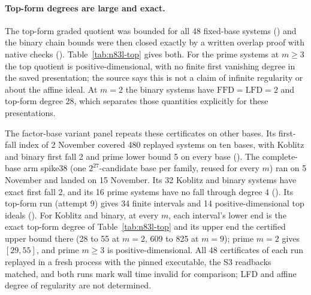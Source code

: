 \paragraph{Top-form degrees are large and exact.} The top-form graded
quotient was bounded for all 48 fixed-base systems
() and the binary chain
bounds were then closed exactly by a written overlap proof with native
checks ().
Table~\ref{tab:n83l-top} gives both. For the prime systems at $m\ge3$ the
top quotient is positive-dimensional, with no finite first vanishing degree
in the saved presentation; the source says this is not a claim of infinite
regularity or about the affine ideal. At $m=2$ the binary systems have
$\text{FFD}=\text{LFD}=2$ and top-form degree 28, which separates those
quantities explicitly for these presentations.

The factor-base variant panel repeats these certificates on other bases.
Its first-fall index of 2 November covered 480 replayed systems on ten
bases, with Koblitz and binary first fall 2 and prime lower bound 5 on
every base
().
The complete-base arm spike38 (one $2^{27}$-candidate base per family,
reused for every $m$) ran on 5 November and landed on 15 November. Its 32
Koblitz and binary systems have exact first fall 2, and its 16 prime systems
have no fall through degree 4
().
Its top-form run (attempt 9) gives 34 finite intervals and 14
positive-dimensional top ideals
().
For Koblitz and binary, at every $m$, each interval's lower end is the
exact top-form degree of Table~\ref{tab:n83l-top} and its upper end the
certified upper bound there (28 to 55 at $m=2$, 609 to 825 at $m=9$); prime
$m=2$ gives
$[29,55]$, and prime $m\ge3$ is positive-dimensional. All 48 certificates of
each run replayed in a fresh process with the pinned executable, the S3
readbacks matched, and both runs mark wall time invalid for comparison;
LFD and affine degree of regularity are not determined.

